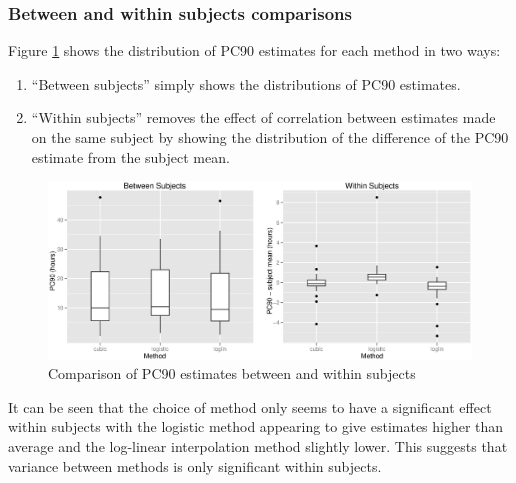 \subsubsection*{Between and within subjects comparisons}
Figure \ref{methodsbysubject} shows the distribution of PC90 estimates for each method in two ways:
\begin{enumerate}
\item ``Between subjects'' simply shows the distributions of PC90 estimates.
\item ``Within subjects'' removes the effect of correlation between estimates made on the same subject by showing the distribution of the difference of the PC90 estimate from the subject mean.
\end{enumerate}
\begin{figure}[p]
\includegraphics[width=6.5in]{methodsbysubject.eps} 
\caption{Comparison of PC90 estimates between and within subjects}
\label{methodsbysubject}
\end{figure}
It can be seen that the choice of method only seems to have a significant effect within subjects with the logistic method appearing to give estimates higher than average and the log-linear interpolation method slightly lower. This suggests that variance between methods is only significant within subjects.
